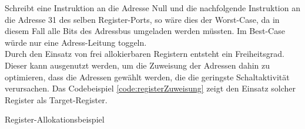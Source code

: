 Schreibt eine Instruktion an die Adresse Null und die nachfolgende Instruktion an die Adresse 31 des selben Register-Ports, so wäre dies der Worst-Case, da in diesem Fall alle Bits des Adressbus umgeladen werden müssten. Im Best-Case würde nur eine Adress-Leitung toggeln.\\
Durch den Einsatz von frei allokierbaren Registern entsteht ein Freiheitsgrad. Dieser kann ausgenutzt werden, um die Zuweisung der Adressen dahin zu optimieren, dass die Adressen gewählt werden, die die geringste Schaltaktivität verursachen. Das Codebeispiel \ref{code:registerZuweisung} zeigt den Einsatz solcher Register als Target-Register. 
\begin{algorithm}[H]
	\begin{algorithmic}[1]
		\caption{Register-Allokationsbeispiel}
		\label{code:registerZuweisung}
	\end{algorithmic}
\end{algorithm}


